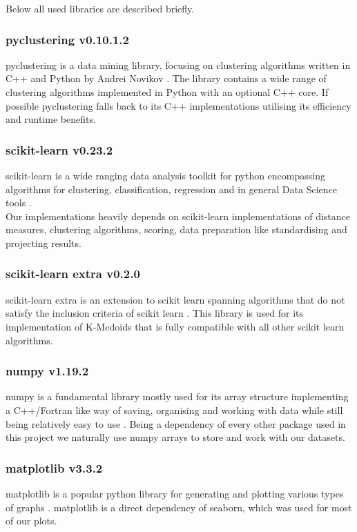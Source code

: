 Below all used libraries are described briefly.

\subsubsection[pyclustering]{pyclustering v0.10.1.2}
pyclustering is a data mining library, focusing on clustering algorithms written in C++ and Python by Andrei Novikov \cite{Novikov2019}. The library contains a wide range of clustering algorithms implemented in Python with an optional C++ core. If possible pyclustering falls back to its C++ implementations utilising its efficiency and runtime benefits.

\subsubsection[scikit-learn]{scikit-learn v0.23.2}
scikit-learn is a wide ranging data analysis toolkit for python encompassing algorithms for clustering, classification, regression and in general Data Science tools \cite{scikitlearn}.\\
Our implementations heavily depends on scikit-learn implementations of distance measures, clustering algorithms, scoring, data preparation like standardising and projecting results. 

\subsubsection[scikit-learn extra]{scikit-learn extra v0.2.0}
scikit-learn extra is an extension to scikit learn spanning algorithms that do not satisfy the inclusion criteria of scikit learn \cite{scikit-learn-extra}. This library is used for its implementation of K-Medoids that is fully compatible with all other scikit learn algorithms.

\subsubsection[numpy]{numpy v1.19.2}
numpy is a fundamental library mostly used for its array structure implementing a C++/Fortran like way of saving, organising and working with data while still being relatively easy to use \cite{numpy}. Being a dependency of every other package used in this project we naturally use numpy arrays to store and work with our datasets.

\subsubsection[matplotlib]{matplotlib v3.3.2}
matplotlib is a popular python library for generating and plotting various types of graphs \cite{Hunter:2007}. matplotlib is a direct dependency of seaborn, which was used for most of our plots.

